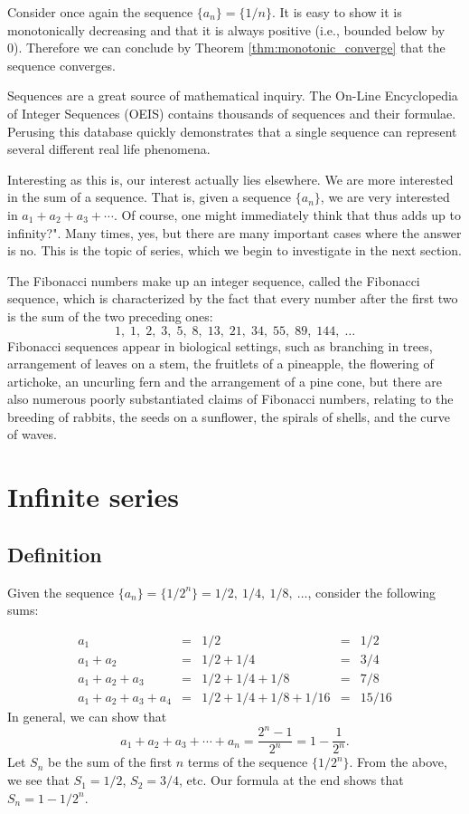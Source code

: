 \fi

Consider once again the sequence $\{a_n\} = \{1/n\}$. It is easy to show it is monotonically decreasing and that it is always positive (i.e., bounded below by 0). Therefore we can conclude by Theorem \ref{thm:monotonic_converge} that the sequence converges.

Sequences are a great source of mathematical inquiry. The On-Line Encyclopedia of Integer Sequences (OEIS) contains thousands of sequences and their formulae. Perusing this database quickly demonstrates that a single sequence can represent several different real life phenomena. 

Interesting as this is, our interest actually lies elsewhere. We are more interested in the sum of a sequence. That is, given a sequence $\{a_n\}$, we are very interested in $a_1+a_2+a_3+\cdots$. Of course, one might immediately think that thus adds up to infinity?". Many times, yes, but there are many important cases where the answer is no. This is the topic of series, which we begin to investigate in the next section.

\begin{remark}
The Fibonacci numbers make up an integer sequence, called the Fibonacci sequence, which is characterized by the fact that every number after the first two is the sum of the two preceding ones:
$$
{\displaystyle 1,\;1,\;2,\;3,\;5,\;8,\;13,\;21,\;34,\;55,\;89,\;144,\;\ldots }
$$
Fibonacci sequences appear in biological settings, such as branching in trees, arrangement of leaves on a stem, the fruitlets of a pineapple, the flowering of artichoke, an uncurling fern and the arrangement of a pine cone, but there are also numerous poorly substantiated claims of Fibonacci numbers, relating to the breeding of rabbits, the seeds on a sunflower, the spirals of shells, and the curve of waves.
\end{remark}

\section{Infinite series}\label{sec:series}
\subsection{Definition}
Given the sequence $\{a_n\} = \{1/2^n\} = 1/2,\ 1/4,\ 1/8,\ \ldots$, consider the following sums:

$$\begin{array}{ccccc}
a_1				&=& 1/2					 &=& 1/2\\
a_1+a_2		&=& 1/2+1/4			 &=& 3/4\\
a_1+a_2+a_3 &=& 1/2+1/4+1/8  &=& 7/8\\
a_1+a_2+a_3+a_4 &=& 1/2+1/4+1/8+1/16 & =& 15/16
\end{array}$$
In general, we can show that $$a_1+a_2+a_3+\cdots +a_n = \frac{2^n-1}{2^n} = 1-\frac{1}{2^n}.$$
Let $S_n$ be the sum of the first $n$ terms of the sequence $\{1/2^n\}$. From the above, we see that $S_1=1/2$, $S_2 = 3/4$, etc. Our formula at the end shows that $S_n = 1-1/2^n$. 

